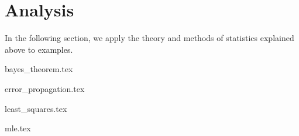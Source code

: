 \section{Analysis}
\label{sec:analysis}

In the following section, we apply the theory and methods of statistics explained above to examples.

{bayes_theorem.tex}

{error_propagation.tex}

{least_squares.tex}

{mle.tex}